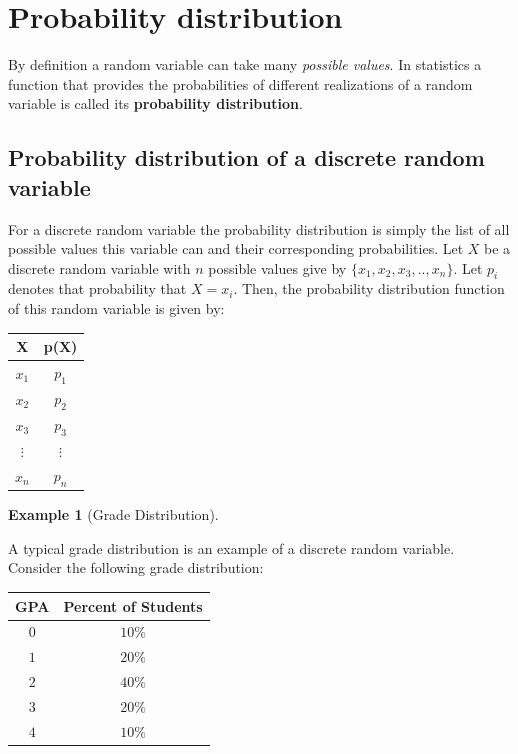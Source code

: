 \documentclass[
]{book}
\theoremstyle{definition}
\theoremstyle{definition}
\newtheorem{example}{Example}[chapter]
\theoremstyle{definition}
\theoremstyle{definition}
\theoremstyle{remark}
\begin{document}
\hypertarget{probability-distribution}{%
\section{Probability distribution}\label{probability-distribution}}

By definition a random variable can take many \emph{possible values}. In statistics a function that provides the probabilities of different realizations of a random variable is called its \textbf{probability distribution}.

\hypertarget{probability-distribution-of-a-discrete-random-variable}{%
\subsection{Probability distribution of a discrete random variable}\label{probability-distribution-of-a-discrete-random-variable}}

For a discrete random variable the probability distribution is simply the list of all possible values this variable can and their corresponding probabilities. Let \(X\) be a discrete random variable with \(n\) possible values give by \(\{x_1,x_2,x_3,..,x_n\}\). Let \(p_i\) denotes that probability that \(X=x_i\). Then, the probability distribution function of this random variable is given by:

\begin{longtable}[]{@{}cc@{}}
\toprule\noalign{}
X & p(X) \\
\midrule\noalign{}
\endhead
\bottomrule\noalign{}
\endlastfoot
\(x_1\) & \(p_1\) \\
\(x_2\) & \(p_2\) \\
\(x_3\) & \(p_3\) \\
\(\vdots\) & \(\vdots\) \\
\(x_n\) & \(p_n\) \\
\end{longtable}

\begin{example}[Grade Distribution]
\protect\hypertarget{exm:unnamed-chunk-72}{}\label{exm:unnamed-chunk-72}

A typical grade distribution is an example of a discrete random variable. Consider the following grade distribution:

\begin{longtable}[]{@{}cc@{}}
\toprule\noalign{}
GPA & Percent of Students \\
\midrule\noalign{}
\endhead
\bottomrule\noalign{}
\endlastfoot
\(0\) & \(10\%\) \\
\(1\) & \(20\%\) \\
\(2\) & \(40\%\) \\
\(3\) & \(20\%\) \\
\(4\) & \(10\%\) \\
\end{longtable}

\end{example}
\end{document}
